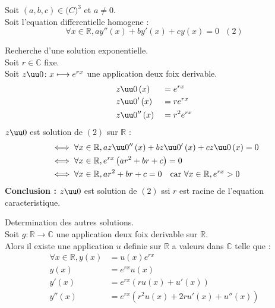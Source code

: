 \documentclass[12pt,twoside,a4paper]{article}
\begin{document}
			\begin{preuve}
				Soit $\left(a,b,c\right)\in\mathbb(C)^3$ et $a\neq0$.\\
				Soit l'equation differentielle homogene :
				$$
					\forall x\in\mathbb{R},ay''\left(x\right)+by'\left(x\right)+cy\left(x\right)=0 \ \ \ \left(2\right)
				$$
				\begin{liste}
					\item Recherche d'une solution exponentielle.\\
						Soit $r\in\mathbb{C}$ fixe.\\
						Soit $z\uu0\colon x\longmapsto e^{rx}$ une application deux foix derivable.
						$$\begin{aligned}
							&z\uu0\left(x\right)&&=e^{rx}\\
							&z\uu0'\left(x\right)&&=re^{rx}\\
							&z\uu0''\left(x\right)&&=r^2e^{rx}
						\end{aligned}$$
						$z\uu0$ est solution de $\left(2\right)$ sur $\mathbb{R}$ :
						$$\begin{aligned}
							&\iff\forall x\in\mathbb{R},az\uu0''\left(x\right)+bz\uu0'\left(x\right)+cz\uu0\left(x\right)=0\\
							&\iff\forall x\in\mathbb{R},e^{rx}\left(ar^2+br+c\right)=0\\
							&\iff\forall x\in\mathbb{R},ar^2+br+c=0 \ \ \ \text{car }\forall x\in\mathbb{R},e^{rx}>0
						\end{aligned}$$
						\textbf{Conclusion :} $z\uu0$ est solution de $\left(2\right)$ ssi $r$ est racine de l'equation caracteristique.
					\item Determination des autres solutions.\\
						Soit $g\colon\mathbb{R}\longrightarrow\mathbb{C}$ une application deux foix derivable sur $\mathbb{R}$.\\
						Alors il existe une application $u$ definie sur $\mathbb{R}$ a valeurs dans $\mathbb{C}$ telle que :
						$$\begin{aligned}
							\forall x\in\mathbb{R},y\left(x\right)&=u\left(x\right)e^{rx} \\
												    y\left(x\right)&=e^{rx}u\left(x\right) \\
												   y'\left(x\right)&=e^{rx}\left(ru\left(x\right)+u'\left(x\right)\right) \\
												  y''\left(x\right)&=e^{rx}\left(r^2u\left(x\right)+2ru'\left(x\right)+u''\left(x\right)\right) \\

\end{aligned}$$
\end{liste}
\end{preuve}
\end{document}
